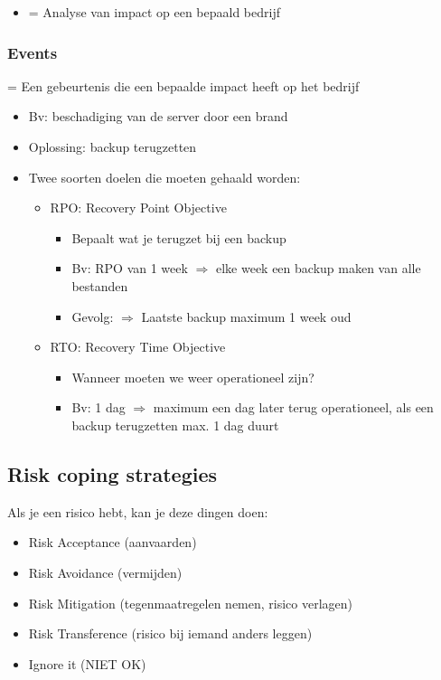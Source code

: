 \documentclass{article}
\begin{document}
\begin{itemize}
    \item = Analyse van impact op een bepaald bedrijf
\end{itemize}

\subsubsection{Events}

= Een gebeurtenis die een bepaalde impact heeft op het bedrijf

\begin{itemize}
    \item Bv: beschadiging van de server door een brand
    \item Oplossing: backup terugzetten
    \item Twee soorten doelen die moeten gehaald worden:
    \begin{itemize}
        \item RPO: Recovery Point Objective
        \begin{itemize}
            \item Bepaalt wat je terugzet bij een backup
            \item Bv: RPO van 1 week $\Rightarrow$ elke week een backup maken van alle bestanden 
            \item Gevolg: $\Rightarrow$ Laatste backup maximum 1 week oud
        \end{itemize}
        \item RTO: Recovery Time Objective
        \begin{itemize}
            \item Wanneer moeten we weer operationeel zijn?
            \item Bv: 1 dag $\Rightarrow$ maximum een dag later terug operationeel, als een backup terugzetten max. 1 dag duurt
        \end{itemize}
    \end{itemize}
\end{itemize}


\subsection{Risk coping strategies}

Als je een risico hebt, kan je deze dingen doen:

\begin{itemize}
    \item Risk Acceptance (aanvaarden)
    \item Risk Avoidance (vermijden)
    \item Risk Mitigation (tegenmaatregelen nemen, risico verlagen)
    \item Risk Transference (risico bij iemand anders leggen)
    \item Ignore it (NIET OK)
\end{itemize}
\end{document}

